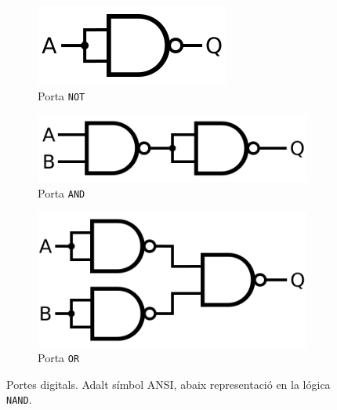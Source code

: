 \documentclass[11pt,a4paper]{article}
\begin{document}
\begin{figure}[H]
\begin{minipage}{0.7\textwidth}
  
  \begin{subfigure}[t]{0.3\textwidth}
    \includegraphics[width=\linewidth]{images/NOT_from_NAND.svg.png}
    \caption{Porta \texttt{NOT}}
  \end{subfigure}
  \hfill
  \begin{subfigure}[t]{0.3\textwidth}
    \includegraphics[width=\linewidth]{images/AND_from_NAND.svg.png}
    \caption{Porta \texttt{AND}}
  \end{subfigure}
  \hfill
  \begin{subfigure}[t]{0.3\textwidth}
    \includegraphics[width=\linewidth]{images/OR_from_NAND.svg.png}
    \caption{Porta \texttt{OR}}
  \end{subfigure}
\end{minipage}
  

  \caption{Portes digitals. Adalt símbol ANSI, abaix representació en la lógica \texttt{NAND}.}
  \label{fig:portes}
\end{figure}
\end{document}
